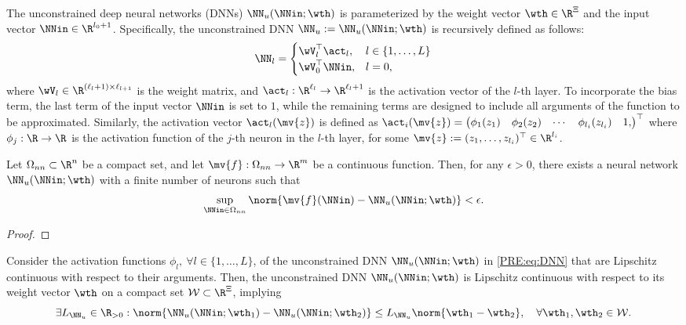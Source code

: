 The unconstrained deep neural networks (DNNs) $\NN_u(\NNin;\wth)$ is parameterized by the weight vector $\wth\in\R^{\Xi}$ and the input vector $\NNin\in\R^{l_0+1}$.
Specifically, the unconstrained DNN $\NN_u:=\NN_u(\NNin;\wth)$ is recursively defined as follows:
\begin{equation}
  \label{PRE:eq:DNN}
  \NN_l
  =
  \begin{cases}
    \wV_l^\top\act_l
    ,
    & 
    l \in \{1,\ldots,L\}
    \\
    \wV_0^\top\NNin
    ,
    &
    l = 0
    ,
  \end{cases}
\end{equation}
where $\wV_l\in\R^{(\ell_{l}+1)\times \ell_{l+1}}$ is the weight matrix, and $\act_l:\R^{\ell_{l}}\to\R^{\ell_{l}+1}$ is the activation vector of the $l$-th layer.
To incorporate the bias term, the last term of the input vector $\NNin$ is set to $1$, while the remaining terms are designed to include all arguments of the function to be approximated.
Similarly, the activation vector $\act_l(\mv{z})$ is defined as 
$
  \act_i(\mv{z}) 
  = 
  \begin{pmatrix}
  \phi_1(z_1) & \phi_2(z_2) & \cdots & \phi_{l_i}(z_{l_i}) & 1
  ,
  \end{pmatrix}^\top
$
where $\phi_j:\R\to\R$ is the activation function of the $j$-th neuron in the $l$-th layer, for some $\mv{z}:=(z_1,\ldots,z_{l_i})^\top\in\R^{l_i}$.

\begin{lem}
  \label{PRE:lem:NN:UAP}
  Let $\Omega_{nn}\subset\R^n$ be a compact set, and let $\mv{f}:\Omega_{nn}\to\R^m$ be a continuous function. 
  Then, for any $\epsilon>0$, there exists a neural network $\NN_u(\NNin;\wth)$ with a finite number of neurons such that
  \begin{equation}
    \sup_{\NNin\in\Omega_{nn}}
    \norm{
      \mv{f}(\NNin) - \NN_u(\NNin;\wth)
    }
    <
    \epsilon
    .
  \end{equation}
\end{lem}

\begin{proof}
\end{proof}

\begin{lem}
  \label{PRE:lem:NN:param:Lipschitz}
  Consider the activation functions $\phi_l,\ \forall l\in\{1,\ldots,L\}$, of the unconstrained DNN $\NN_u(\NNin;\wth)$ in \eqref{PRE:eq:DNN} that are Lipschitz continuous with respect to their arguments. 
  Then, the unconstrained DNN $\NN_u(\NNin;\wth)$ is Lipschitz continuous with respect to its weight vector $\wth$ on a compact set $\mathcal{W}\subset\R^{\Xi}$, implying
  \begin{equation}
    \exists
    L_{\NN_u}\in\R_{>0}
    :
    \norm{
      \NN_u(\NNin;\wth_1) - \NN_u(\NNin;\wth_2)
    }
    \le
    L_{\NN_u}
    \norm{\wth_1-\wth_2}
    ,
    \quad\forall \wth_1,\wth_2\in\mathcal{W}
    .
  \end{equation}
\end{lem}

